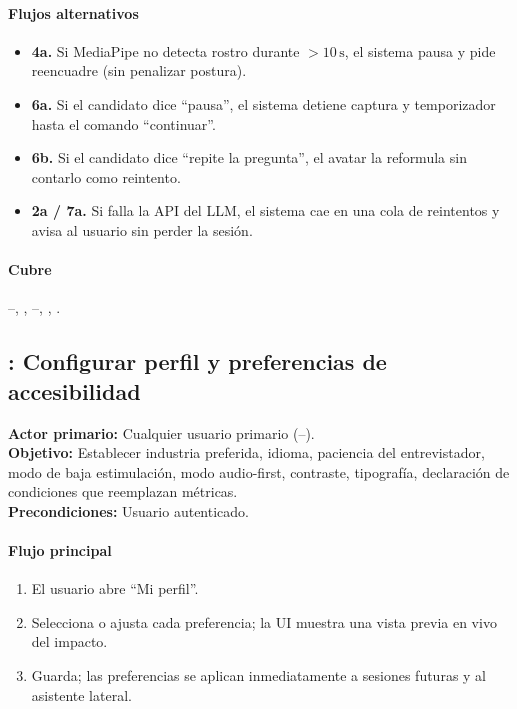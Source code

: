 \paragraph{Flujos alternativos}
\begin{itemize}
  \item \textbf{4a.} Si MediaPipe no detecta rostro durante $>10\,\mathrm{s}$,
        el sistema pausa y pide reencuadre (sin penalizar postura).
  \item \textbf{6a.} Si el candidato dice ``pausa'', el sistema detiene
        captura y temporizador hasta el comando ``continuar''.
  \item \textbf{6b.} Si el candidato dice ``repite la pregunta'', el
        avatar la reformula sin contarlo como reintento.
  \item \textbf{2a / 7a.} Si falla la API del LLM, el sistema cae en una
        cola de reintentos y avisa al usuario sin perder la sesión.
\end{itemize}

\paragraph{Cubre} --, , --,
, .

\subsection{: Configurar perfil y preferencias de accesibilidad}
\begin{cajaCriterio}
\textbf{Actor primario:} Cualquier usuario primario (--). \\
\textbf{Objetivo:} Establecer industria preferida, idioma, paciencia del
entrevistador, modo de baja estimulación, modo audio-first, contraste,
tipografía, declaración de condiciones que reemplazan métricas. \\
\textbf{Precondiciones:} Usuario autenticado.
\end{cajaCriterio}

\paragraph{Flujo principal}
\begin{enumerate}
  \item El usuario abre ``Mi perfil''.
  \item Selecciona o ajusta cada preferencia; la UI muestra una vista
        previa en vivo del impacto.
  \item Guarda; las preferencias se aplican inmediatamente a sesiones
        futuras y al asistente lateral.
\end{enumerate}

